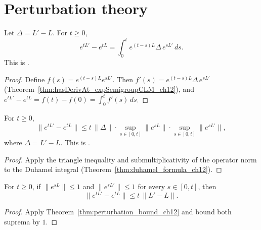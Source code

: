 \section{Perturbation theory}
\label{sec:perturbation}

\begin{theorem}\label{thm:duhamel_formula_ch12}
    \leanok
    Let $\Delta = L' - L$. For $t \ge 0$,
    \[
        e^{tL'} - e^{tL}
        = \int_0^t e^{(t-s)L} \Delta\,e^{sL'}\,ds.
    \]
    This is \cite[Lemma~7.1]{Wolf2012Quantum}.
\end{theorem}

\begin{proof}
    \leanok
    Define $f(s) = e^{(t-s)L} e^{sL'}$.
    Then $f'(s) = e^{(t-s)L} \Delta\,e^{sL'}$
    (Theorem~\ref{thm:hasDerivAt_expSemigroupCLM_ch12}),
    and $e^{tL'} - e^{tL} = f(t) - f(0) = \int_0^t f'(s)\,ds$.
\end{proof}

\begin{theorem}\label{thm:perturbation_bound_ch12}
    \leanok
    For $t \ge 0$,
    \[
        \bigl\|e^{tL'} - e^{tL}\bigr\|
        \le t\,\|\Delta\|
        \cdot \sup_{s \in [0,t]}\|e^{sL}\|
        \cdot \sup_{s \in [0,t]}\|e^{sL'}\|,
    \]
    where $\Delta = L' - L$.
    This is \cite[Corollary~7.1]{Wolf2012Quantum}.
\end{theorem}

\begin{proof}
    \leanok
    Apply the triangle inequality and submultiplicativity of the
    operator norm to the Duhamel integral
    (Theorem~\ref{thm:duhamel_formula_ch12}).
\end{proof}

\begin{corollary}
    \label{cor:perturbation_bound_unit_norm_ch12}
    \leanok
    For $t \ge 0$, if $\|e^{sL}\| \le 1$ and $\|e^{sL'}\| \le 1$ for every
    $s \in [0,t]$, then
    \[
        \|e^{tL'} - e^{tL}\| \le t\,\|L' - L\|.
    \]
\end{corollary}

\begin{proof}
    \leanok
    Apply Theorem~\ref{thm:perturbation_bound_ch12} and bound both suprema by $1$.
\end{proof}

